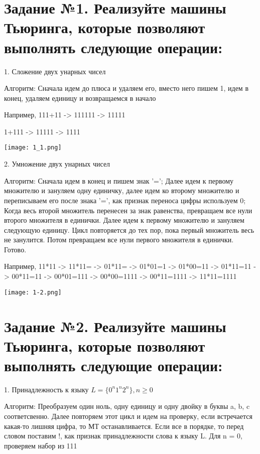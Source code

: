 \documentclass{article}
\title{homeWork#3}
\author{Kalinina Ksenia A-13a-19}
\date{May 2022}
\begin{document}
\maketitle

\section{Задание №1. Реализуйте машины Тьюринга, которые позволяют выполнять следующие операции:}

1. Сложение двух унарных чисел

Алгоритм: 
Сначала идем до плюса и удаляем его, вместо него пишем 1, идем в конец, удаляем единицу и возвращаемся в начало

Например, 111+11 -> 111111 -> 11111

          1+111 -> 11111 -> 1111 


\texttt{[image: 1\_1.png]}


 2. Умножение двух унарных чисел
 
Алгоритм:
Сначала идем в конец и пишем знак '='; Далее идем к первому множителю и зануляем одну единичку, далее идем ко второму множителю и переписываем его после знака '=', как признак переноса цифры используем 0; Когда весь второй множитель перенесен за знак равенства, превращаем все нули второго множителя в единички. Далее идем к первому множителю и зануляем следующую единицу. Цикл повторяется до тех пор, пока первый множитель весь не занулится. Потом превращаем все нули первого множителя в единички. Готово.

Например, 11*11 -> 11*11= -> 01*11= -> 01*01=1 -> 01*00=11 -> 01*11=11 -> 00*11=11 -> 00*01=111 -> 00*00=1111 -> 00*11=1111 -> 11*11=1111


\texttt{[image: 1-2.png]}


\section{Задание №2. Реализуйте машины Тьюринга, которые позволяют выполнять следующие операции:}

1. Принадлежность к языку \(L = \{0^n1^n2^n\}, n \geq 0\)

Алгоритм:
Преобразуем один ноль, одну единицу и одну двойку в буквы a, b, c соответсвенно. Далее повторяем этот цикл и идем на проверку, если встречается какая-то лишняя цифра, то МТ останавливается. Если все в порядке, то перед словом поставим !, как признак принадлежности слова к языку L.
Для n = 0, проверяем набор из 111
\end{document}
